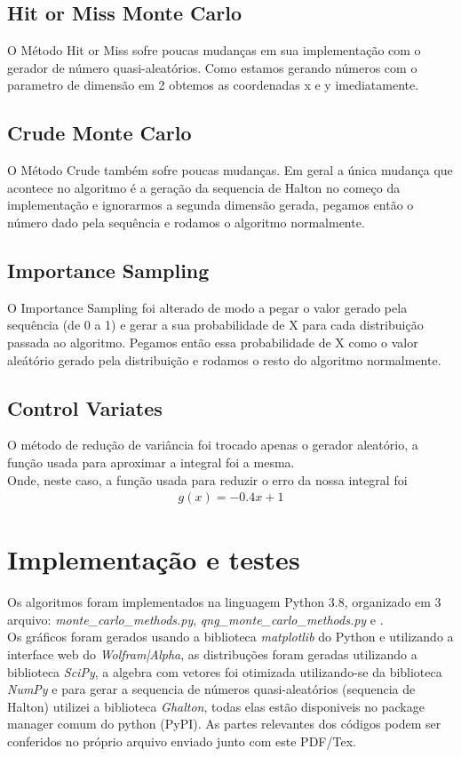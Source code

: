 \documentclass[twocolumn,amsmath,amssymb,floatfix]{revtex4}
\begin{document}
\subsection{Hit or Miss Monte Carlo}
\indent O Método Hit or Miss sofre poucas mudanças em sua implementação com o gerador de número quasi-aleatórios. Como estamos gerando números com o parametro de dimensão em 2 obtemos as coordenadas x e y imediatamente.
\subsection{Crude Monte Carlo}
\indent O Método Crude também sofre poucas mudanças. Em geral a única mudança que acontece no algoritmo é a geração da sequencia de Halton no começo da implementação e ignorarmos a segunda dimensão gerada, pegamos então o número dado pela sequência e rodamos o algoritmo normalmente.
\subsection{Importance Sampling}
\indent O Importance Sampling foi alterado de modo a pegar o valor gerado pela sequência (de 0 a 1) e gerar a sua probabilidade de X para cada distribuição passada ao algoritmo. Pegamos então essa probabilidade de X como o valor aleátório gerado pela distribuição e rodamos o resto do algoritmo normalmente.
\subsection{Control Variates}
\indent O método de redução de variância foi trocado apenas o gerador aleatório, a função usada para aproximar a integral foi a mesma. \\
\indent Onde, neste caso, a função usada para reduzir o erro da nossa integral foi
\begin{eqnarray}
  g(x) = -0.4x + 1
\end{eqnarray}
\section{Implementação e testes}

\indent Os algoritmos foram implementados na linguagem Python 3.8, organizado em 3 arquivo: \textit{monte\_carlo\_methods.py}, \textit{qng\_monte\_carlo\_methods.py} e . \\
\indent Os gráficos foram gerados usando a biblioteca \textit{matplotlib} do Python e utilizando a interface web do \textit{Wolfram|Alpha}, as distribuções foram geradas utilizando a biblioteca \textit{SciPy}, a algebra com vetores foi otimizada utilizando-se da biblioteca \textit{NumPy} e para gerar a sequencia de números quasi-aleatórios (sequencia de Halton) utilizei a biblioteca \textit{Ghalton}, todas elas estão disponiveis no package manager comum do python (PyPI). As partes relevantes dos códigos podem ser conferidos no próprio arquivo enviado junto com este PDF/Tex.
\end{document}
